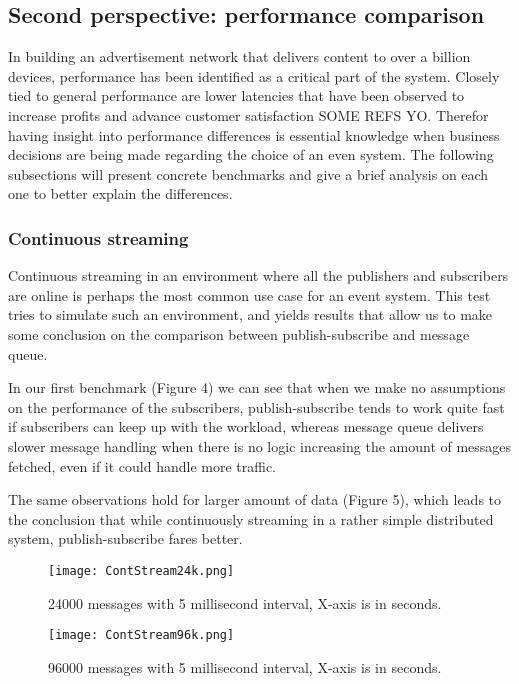 \documentclass[conference]{IEEEtran}
\begin{document}
\subsection{Second perspective: performance comparison}
In building an advertisement network that delivers content to over a billion devices, performance has been identified as a critical part of the system. Closely tied to general performance are lower latencies that have been observed to increase profits and advance customer satisfaction SOME REFS YO. Therefor having insight into performance differences is essential knowledge when business decisions are being made regarding the choice of an even system.
The following subsections will present concrete benchmarks and give a brief analysis on each one to better explain the differences.
\\

\subsubsection{Continuous streaming}
Continuous streaming in an environment where all the publishers and subscribers are online is perhaps the most common use case for an event system. This test tries to simulate such an environment, and yields results that allow us to make some conclusion on the comparison  between publish-subscribe and message queue.

In our first benchmark (Figure 4) we can see that when we make no assumptions on the performance of the subscribers, publish-subscribe tends to work quite fast if subscribers can keep up with the workload, whereas message queue delivers slower message handling when there is no logic increasing the amount of messages fetched, even if it could handle more traffic.

The same observations hold for larger amount of data (Figure 5), which leads to the conclusion that while continuously streaming in a rather simple distributed system, publish-subscribe fares better.

\begin{figure}[h]
    \centering
    \texttt{[image: ContStream24k.png]}
    \caption{24000 messages with 5 millisecond interval, X-axis is in seconds.}
\end{figure}

\begin{figure}[h]
    \centering
    \texttt{[image: ContStream96k.png]}
    \caption{96000 messages with 5 millisecond interval, X-axis is in seconds.}
\end{figure}
\end{document}
